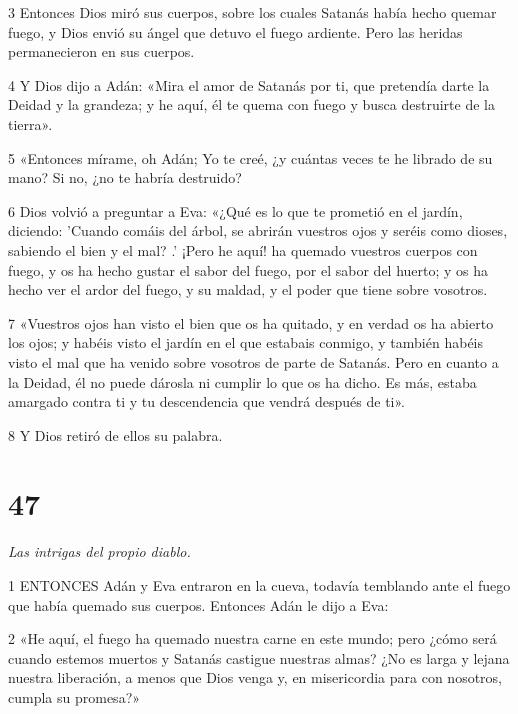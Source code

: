 \par 3 Entonces Dios miró sus cuerpos, sobre los cuales Satanás había hecho quemar fuego, y Dios envió su ángel que detuvo el fuego ardiente. Pero las heridas permanecieron en sus cuerpos.

\par 4 Y Dios dijo a Adán: «Mira el amor de Satanás por ti, que pretendía darte la Deidad y la grandeza; y he aquí, él te quema con fuego y busca destruirte de la tierra».

\par 5 «Entonces mírame, oh Adán; Yo te creé, ¿y cuántas veces te he librado de su mano? Si no, ¿no te habría destruido?

\par 6 Dios volvió a preguntar a Eva: «¿Qué es lo que te prometió en el jardín, diciendo: 'Cuando comáis del árbol, se abrirán vuestros ojos y seréis como dioses, sabiendo el bien y el mal? .' ¡Pero he aquí! ha quemado vuestros cuerpos con fuego, y os ha hecho gustar el sabor del fuego, por el sabor del huerto; y os ha hecho ver el ardor del fuego, y su maldad, y el poder que tiene sobre vosotros.

\par 7 «Vuestros ojos han visto el bien que os ha quitado, y en verdad os ha abierto los ojos; y habéis visto el jardín en el que estabais conmigo, y también habéis visto el mal que ha venido sobre vosotros de parte de Satanás. Pero en cuanto a la Deidad, él no puede dárosla ni cumplir lo que os ha dicho. Es más, estaba amargado contra ti y tu descendencia que vendrá después de ti».

\par 8 Y Dios retiró de ellos su palabra.

\chapter{47}

\par \textit{Las intrigas del propio diablo.}

\par 1 ENTONCES Adán y Eva entraron en la cueva, todavía temblando ante el fuego que había quemado sus cuerpos. Entonces Adán le dijo a Eva:

\par 2 «He aquí, el fuego ha quemado nuestra carne en este mundo; pero ¿cómo será cuando estemos muertos y Satanás castigue nuestras almas? ¿No es larga y lejana nuestra liberación, a menos que Dios venga y, en misericordia para con nosotros, cumpla su promesa?»

